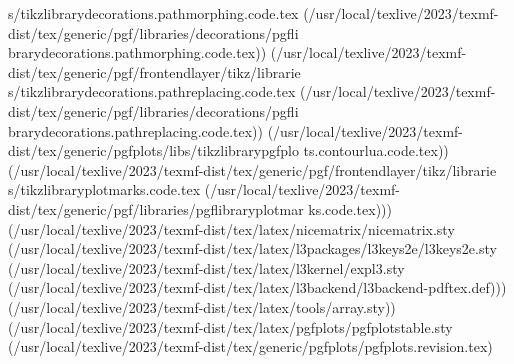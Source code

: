 s/tikzlibrarydecorations.pathmorphing.code.tex
(/usr/local/texlive/2023/texmf-dist/tex/generic/pgf/libraries/decorations/pgfli
brarydecorations.pathmorphing.code.tex))
(/usr/local/texlive/2023/texmf-dist/tex/generic/pgf/frontendlayer/tikz/librarie
s/tikzlibrarydecorations.pathreplacing.code.tex
(/usr/local/texlive/2023/texmf-dist/tex/generic/pgf/libraries/decorations/pgfli
brarydecorations.pathreplacing.code.tex))
(/usr/local/texlive/2023/texmf-dist/tex/generic/pgfplots/libs/tikzlibrarypgfplo
ts.contourlua.code.tex))
(/usr/local/texlive/2023/texmf-dist/tex/generic/pgf/frontendlayer/tikz/librarie
s/tikzlibraryplotmarks.code.tex
(/usr/local/texlive/2023/texmf-dist/tex/generic/pgf/libraries/pgflibraryplotmar
ks.code.tex)))
(/usr/local/texlive/2023/texmf-dist/tex/latex/nicematrix/nicematrix.sty
(/usr/local/texlive/2023/texmf-dist/tex/latex/l3packages/l3keys2e/l3keys2e.sty
(/usr/local/texlive/2023/texmf-dist/tex/latex/l3kernel/expl3.sty
(/usr/local/texlive/2023/texmf-dist/tex/latex/l3backend/l3backend-pdftex.def)))
(/usr/local/texlive/2023/texmf-dist/tex/latex/tools/array.sty))
(/usr/local/texlive/2023/texmf-dist/tex/latex/pgfplots/pgfplotstable.sty
(/usr/local/texlive/2023/texmf-dist/tex/generic/pgfplots/pgfplots.revision.tex)

